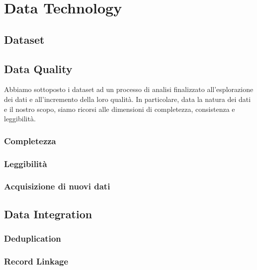 \setcounter{chapter}{0}

\part{Data Technology}

\chapter{Dataset}

\chapter{Data Quality}
\label{chap:data-quality}
Abbiamo sottoposto i dataset ad un processo di analisi finalizzato 
all'esplorazione dei dati e all'incremento della loro qualità. In particolare, 
data la natura dei dati e il nostro scopo, siamo ricorsi alle dimensioni di 
completezza, consistenza e leggibilità.


\section{Completezza}

\section{Leggibilità}

\section{Acquisizione di nuovi dati}

\chapter{Data Integration}
\label{chap:data-integration}

\section{Deduplication}

\section{Record Linkage}
\label{sec:record-linkage}


